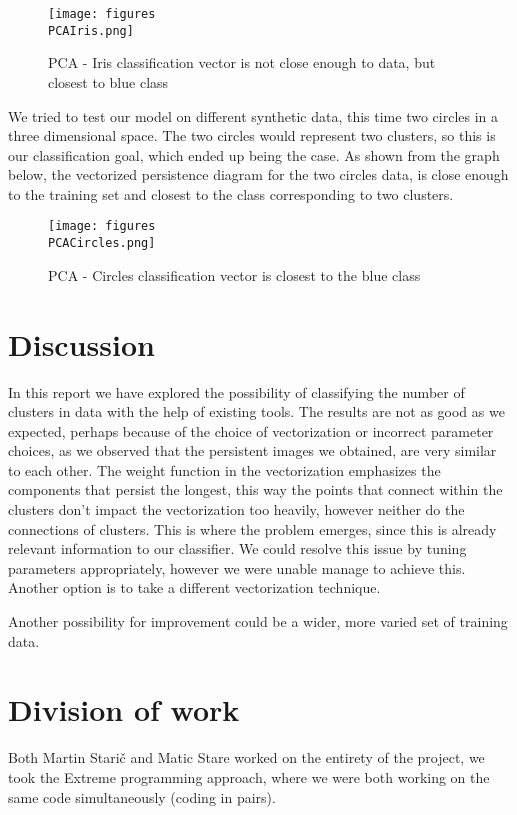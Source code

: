 \documentclass{article}
\begin{document}
\begin{figure}[H]
    \centering
    \texttt{[image: figures\\PCAIris.png]}
    \caption{PCA - Iris classification vector is not close enough to data, but closest to blue class}
    \label{fig:Training set}
\end{figure}

We tried to test our model on different synthetic data, this time two circles in a three dimensional space. The two circles would represent two clusters, so this is our classification goal, which ended up being the case. As shown from the graph below, the vectorized persistence diagram for the two circles data, is close enough to the training set and closest to the class corresponding to two clusters.

\begin{figure}[H]
    \centering
    \texttt{[image: figures\\PCACircles.png]}
    \caption{PCA - Circles classification vector is closest to the blue class}
    \label{fig:Training set}
\end{figure}

\section{Discussion}
In this report we have explored the possibility of classifying the number of clusters in data with the help of existing tools. The results are not as good as we expected, perhaps because of the choice of vectorization or incorrect parameter choices, as
we observed that the persistent images we obtained, are very similar to each other. The weight function in the vectorization emphasizes the components that persist the longest, this way the points that connect within the clusters don't impact the vectorization too heavily, however neither do the connections of clusters. This is where the problem emerges, since this is already relevant information to our classifier. We could resolve this issue by tuning parameters appropriately, however we were unable manage to achieve this. Another option is to take a different vectorization technique.\par
Another possibility for improvement could be a wider, more varied set of training data.

\section{Division of work}
Both Martin Starič and Matic Stare worked on the entirety of the project, we took the Extreme programming approach, where we were both working on the same code simultaneously (coding in pairs).
\end{document}
